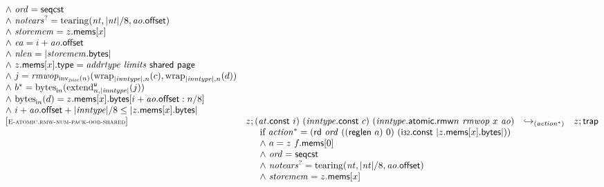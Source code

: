 $$\begin{array}[t]{@{}lrcl@{}l@{}}
{\begin{array}[t]{@{}l@{}}
{\land}~ {\mathit{ord}} = \mathsf{seqcst} \\
{\land}~ {{\mathit{notears}}^?} = {\mathrm{tearing}}({\mathit{nt}}, {|{\mathit{nt}}|} / 8, {\mathit{ao}}{.}\mathsf{offset}) \\
{\land}~ {\mathit{storemem}} = z{.}\mathsf{mems}{}[x] \\
{\land}~ {\mathit{ea}} = i + {\mathit{ao}}{.}\mathsf{offset} \\
{\land}~ {\mathit{nlen}} = {|{\mathit{storemem}}{.}\mathsf{bytes}|} \\
{\land}~ z{.}\mathsf{mems}{}[x]{.}\mathsf{type} = {\mathit{addrtype}}~{\mathit{limits}}~\mathsf{shared}~\mathsf{page} \\
{\land}~ j = {{\mathit{rmwop}}}{{}_{{\mathrm{inv}}_{\mathit{jsize}}(n)}({{\mathrm{wrap}}}_{{|{\mathit{inntype}}|}, n}(c), {{\mathrm{wrap}}}_{{|{\mathit{inntype}}|}, n}(d))} \\
{\land}~ {b^\ast} = {{\mathrm{bytes}}}_{{\mathsf{i}}{n}}({{{{\mathrm{extend}}}_{n, {|{\mathit{inntype}}|}}^{\mathsf{u}}}}{(j)}) \\
{\land}~ {{\mathrm{bytes}}}_{{\mathsf{i}}{n}}(d) = z{.}\mathsf{mems}{}[x]{.}\mathsf{bytes}{}[i + {\mathit{ao}}{.}\mathsf{offset} : n / 8] \\
{\land}~ i + {\mathit{ao}}{.}\mathsf{offset} + {|{\mathit{inntype}}|} / 8 \leq {|z{.}\mathsf{mems}{}[x]{.}\mathsf{bytes}|} \\
\end{array}
} \\
{[\textsc{\scriptsize E{-}atomic.rmw{-}num{-}pack{-}oob{-}shared}]} \quad & z ; ({\mathit{at}}{.}\mathsf{const}~i)~({\mathit{inntype}}{.}\mathsf{const}~c)~({{\mathit{inntype}}{.}\mathsf{atomic}{.}\mathsf{rmw}}{n}~{\mathit{rmwop}}~x~{\mathit{ao}}) & {\hookrightarrow}_{({{\mathit{action}}^\ast})} {} & z ; \mathsf{trap} &  \\
& \multicolumn{4}{@{}l@{}}{\quad
\quad
\begin{array}[t]{@{}l@{}}
\mbox{if}~ {{\mathit{action}}^\ast} = (\mathsf{rd}~{\mathit{ord}}~((\mathsf{reglen}~a)~0)~(\mathsf{i{\scriptstyle 32}}{.}\mathsf{const}~{|z{.}\mathsf{mems}{}[x]{.}\mathsf{bytes}|})) \\
{\land}~ a = z~f{.}\mathsf{mems}{}[0] \\
{\land}~ {\mathit{ord}} = \mathsf{seqcst} \\
{\land}~ {{\mathit{notears}}^?} = {\mathrm{tearing}}({\mathit{nt}}, {|{\mathit{nt}}|} / 8, {\mathit{ao}}{.}\mathsf{offset}) \\
{\land}~ {\mathit{storemem}} = z{.}\mathsf{mems}{}[x] \\

\end{array}}
\end{array}$$
